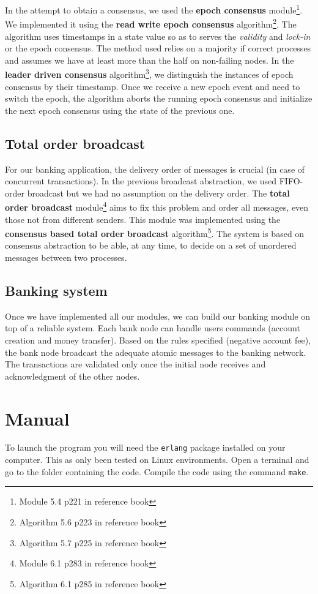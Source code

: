 \documentclass[11pt,english,a4paper]{article}
\begin{document}
In the attempt to obtain a consensus, we used the \textbf{epoch consensus} module\footnote{Module 5.4 p221 in reference book}.
We implemented it using the \textbf{read write epoch consensus} algorithm\footnote{Algorithm 5.6 p223 in reference book}.
The algorithm uses timestamps in a state value so as to serves the \emph{validity} and \emph{lock-in} or the epoch consensus.
The method used relies on a majority if correct processes and assumes we have at least more than the half on non-failing nodes.
In the \textbf{leader driven consensus} algorithm\footnote{Algorithm 5.7 p225 in reference book}, we distinguish the instances of epoch consensus by their timestamp.
Once we receive a new epoch event and need to switch the epoch, the algorithm
aborts the running epoch consensus and initialize the next epoch consensus using the state of the previous one.

\subsection*{Total order broadcast}
For our banking application, the delivery order of messages is crucial (in case of concurrent transactions).
In the previous broadcast abstraction, we used FIFO-order broadcast but we had no assumption on the delivery order.
The \textbf{total order broadcast} module\footnote{Module 6.1 p283 in reference book} aims to fix this problem and order all messages, even those not from different senders.
This module was implemented using the \textbf{consensus based total order broadcast} algorithm\footnote{Algorithm 6.1 p285 in reference book}.
The system is based on consensus abstraction to be able, at any time, to decide on a set of unordered messages between two processes.

\subsection*{Banking system}
Once we have implemented all our modules, we can build our banking module on top of a reliable system.
Each bank node can handle users commands (account creation and money transfer).
Based on the rules specified (negative account fee), the bank node broadcast the adequate atomic messages to the banking network.
The transactions are validated only once the initial node receives and acknowledgment of the other nodes.

\section{Manual}
To launch the program you will need the \texttt{erlang} package installed on your computer.
This as only been tested on Linux environments.
Open a terminal and go to the folder containing the code.
Compile the code using the command \texttt{make}.\\
\end{document}
